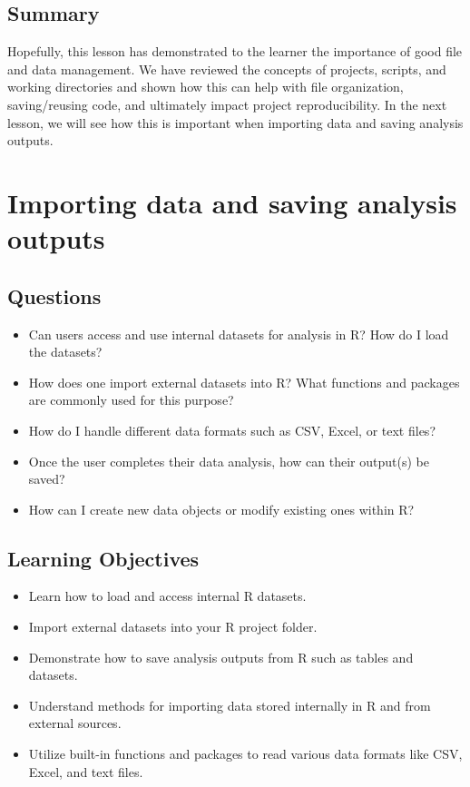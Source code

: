 \documentclass[
  letterpaper,
  DIV=11,
  numbers=noendperiod]{scrreprt}
\begin{document}
\section{Summary}\label{summary-3}

Hopefully, this lesson has demonstrated to the learner the importance of
good file and data management. We have reviewed the concepts of
projects, scripts, and working directories and shown how this can help
with file organization, saving/reusing code, and ultimately impact
project reproducibility. In the next lesson, we will see how this is
important when importing data and saving analysis outputs.


\chapter{Importing data and saving analysis
outputs}\label{sec-import-save}

\section{Questions}\label{questions-4}

\begin{itemize}
\item
  Can users access and use internal datasets for analysis in R? How do I
  load the datasets?
\item
  How does one import external datasets into R? What functions and
  packages are commonly used for this purpose?
\item
  How do I handle different data formats such as CSV, Excel, or text
  files?
\item
  Once the user completes their data analysis, how can their output(s)
  be saved?
\item
  How can I create new data objects or modify existing ones within R?
\end{itemize}

\section{Learning Objectives}\label{learning-objectives-4}

\begin{itemize}
\item
  Learn how to load and access internal R datasets.
\item
  Import external datasets into your R project folder.
\item
  Demonstrate how to save analysis outputs from R such as tables and
  datasets.
\item
  Understand methods for importing data stored internally in R and from
  external sources.
\item
  Utilize built-in functions and packages to read various data formats
  like CSV, Excel, and text files.
\end{itemize}
\end{document}
